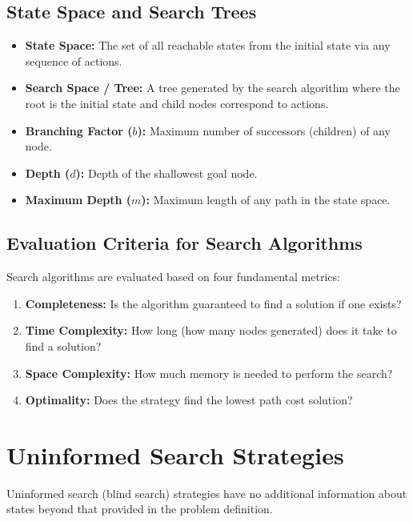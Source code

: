 \documentclass[12pt,a4paper]{article}
\begin{document}
\subsection{State Space and Search Trees}
\begin{itemize}[leftmargin=*, itemsep=3pt]
  \item \textbf{State Space:} The set of all reachable states from the initial state via any sequence of actions.
  \item \textbf{Search Space / Tree:} A tree generated by the search algorithm where the root is the initial state and child nodes correspond to actions.
  \item \textbf{Branching Factor ($b$):} Maximum number of successors (children) of any node.
  \item \textbf{Depth ($d$):} Depth of the shallowest goal node.
  \item \textbf{Maximum Depth ($m$):} Maximum length of any path in the state space.
\end{itemize}

\subsection{Evaluation Criteria for Search Algorithms}
Search algorithms are evaluated based on four fundamental metrics:
\begin{enumerate}[leftmargin=*, itemsep=3pt]
  \item \textbf{Completeness:} Is the algorithm guaranteed to find a solution if one exists?
  \item \textbf{Time Complexity:} How long (how many nodes generated) does it take to find a solution?
  \item \textbf{Space Complexity:} How much memory is needed to perform the search?
  \item \textbf{Optimality:} Does the strategy find the lowest path cost solution?
\end{enumerate}

\section{Uninformed Search Strategies}

Uninformed search (blind search) strategies have no additional information about states beyond that provided in the problem definition.
\end{document}
